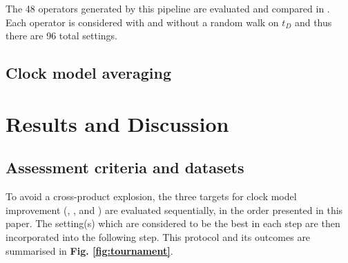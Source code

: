\documentclass[10pt,letterpaper]{article}
\begin{document}
The 48 operators generated by this pipeline are evaluated and compared in \textbf{}. Each operator is considered with and without a random walk on $t_D$ and thus there are 96 total settings.








\subsection*{Clock model averaging}




\section*{Results and Discussion} \label{sect:results}




\subsection*{Assessment criteria and datasets}


To avoid a cross-product explosion, the three targets for clock model improvement (\textbf{}, \textbf{}, and \textbf{}) are evaluated sequentially, in the order presented in this paper. The setting(s) which are considered to be the best in each step are then incorporated into the following step. This protocol and its outcomes are summarised in \textbf{Fig. \ref{fig:tournament}}.
\end{document}
